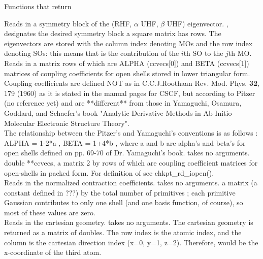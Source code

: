 \begin{center}
Functions that return 
\end{center}
{Reads in a symmetry block of 
the (RHF, $\alpha$ UHF, $\beta$ UHF) eigenvector.}
{, designates the desired symmetry block}
{a square matrix has 
rows.  The eigenvectors are stored with the column 
index denoting MOs and the row index denoting SOs: this means that 
 is the contribution of the $i$th SO to the $j$th MO.} \\
{Reads in a matrix rows of which are 
ALPHA (ccvecs[0]) and BETA (ccvecs[1]) matrices of coupling
coefficients for open shells stored in lower triangular form.
Coupling coefficients are defined NOT as in 
C.C.J.Roothaan Rev. Mod. Phys. {\bf 32}, 179 (1960) as it is stated in the
manual pages for CSCF, but according to Pitzer (no reference yet)
and are **different** from those in Yamaguchi, Osamura, Goddard, and
Schaefer's book "Analytic Derivative Methods in Ab Initio Molecular
Electronic Structure Theory".\\
The relationship between the Pitzer's and Yamaguchi's conventions is 
as follows : ALPHA = 1-2*a , BETA = 1+4*b , where a and b are 
alpha's and beta's for open shells 
defined on pp. 69-70 of Dr. Yamaguchi's book.
}
{takes no arguments.}
{double **ccvecs, a matrix 2 by  rows of which are coupling
coefficient matrices for open-shells in packed form.
For definition of  see chkpt\_rd\_iopen().} \\
{Reads in the normalized contraction coefficients.}
{takes no arguments.}
{a matrix  (a constant defined in ???)
by the total number of primitives ;
each primitive Gaussian contributes to only one shell (and one
basis function, of course), so most of these values are zero.} \\
{Reads in the cartesian geometry.}
{takes no arguments.}
{The cartesian geometry is returned as a matrix
of doubles.  The row index is the atomic index, and the column is the
cartesian direction index (x=0, y=1, z=2).  Therefore, 
would be the x-coordinate of the third atom.} \\
